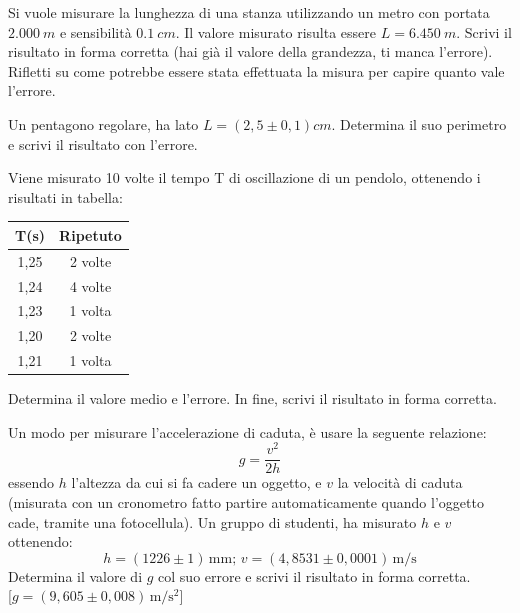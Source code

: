 \begin{esercizio}
Si vuole misurare la lunghezza di una stanza utilizzando un metro con portata $\SI{2,000}{m}$ e sensibilità $\SI{0,1}{cm}$. Il valore misurato risulta essere $L=\SI{6,450}{m}$. Scrivi il risultato in forma corretta (hai già il valore della grandezza, ti manca l'errore). Rifletti su come potrebbe essere stata effettuata la misura per capire quanto vale l'errore.\\
\end{esercizio}

\begin{esercizio}
Un pentagono regolare, ha lato $L=\left(2,5 \pm 0,1\right)\si{cm}$. Determina il suo perimetro e scrivi il risultato con l'errore.\\
\end{esercizio}
\begin{esercizio}
Viene misurato 10 volte il tempo T di oscillazione di un pendolo, ottenendo i risultati in tabella:

\begin{center}
\begin{tabular}{|c|c|}
\hline 
T(s)& Ripetuto\\
\hline
1,25 & 2 volte\\
1,24 & 4 volte \\
1,23 & 1 volta \\
1,20 & 2 volte \\
1,21 & 1 volta \\
\hline
\end{tabular}
\end{center}
Determina il valore medio e l'errore. In fine, scrivi il risultato in forma corretta.\\
\end{esercizio}
\begin{esercizio}
Un modo per misurare l'accelerazione di caduta, è usare la seguente relazione:
\[
g=\frac{v^2}{2 h}
\]
essendo $h$ l'altezza da cui si fa cadere un oggetto, e $v$ la velocità di caduta (misurata con un cronometro fatto partire automaticamente quando l'oggetto cade, tramite una fotocellula). Un gruppo di studenti, ha misurato $h$ e $v$ ottenendo:
\[
h=\left(1226 \pm 1 \right) \, \si{\milli\meter} \text{;}\,\, v=\left(4,8531 \pm  0,0001\right) \, \si{\meter\per\second} 
\]
Determina il valore di $g$ col suo errore e scrivi il risultato in forma corretta. \\\hspace*{\fill} [$g=\left(9,605 \pm 0,008 \right) \, \si{\meter\per\square\second}$] 
\end{esercizio}

